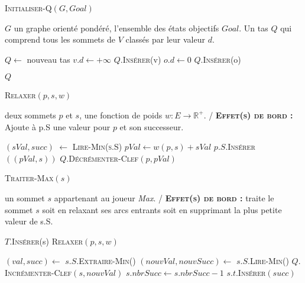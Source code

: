 

\begin{algorithm}
	\caption{\textsc {Initialiser-Q}$(G,Goal)$}
	 \label{algo:initQ}
	\begin{algorithmic}[1]
		\REQUIRE $G$ un graphe orienté pondéré, l'ensemble des états objectifs $Goal$.
		\ENSURE Un tas $Q$ qui comprend tous les sommets de $V$ classés par leur valeur $d$.
		
		\STATE $Q \leftarrow$ nouveau tas 
			\STATE $v.d \leftarrow +\infty$
			\STATE $Q.$\textsc{Insérer}(v)
		\ENDFOR
			\STATE $o.d \leftarrow 0$
			\STATE $Q.$\textsc{Insérer}(o)	
		\ENDFOR
		
		\RETURN $Q$
	
			
\end{algorithmic}
		
\end{algorithm}


\begin{algorithm}
	\caption{\textsc {Relaxer}$(p,s,w)$}
	 \label{algo:relaxerMinMax}
	\begin{algorithmic}[1]
		\REQUIRE deux sommets $p$ et $s$, une fonction de poids $w : E \rightarrow \mathbb{R}^{+}$.
		\ENSURE / \textbf{\textsc{Effet(s) de bord :}} Ajoute à p.S une valeur pour $p$ et son successeur.
		
		\STATE $(sVal,succ)$ $\leftarrow$ \textsc{Lire-Min(s.S)}
		\STATE $pVal \leftarrow w(p,s) + sVal$
		\STATE $p.S.$\textsc{Insérer}$((pVal,s))$
		\STATE $Q.$\textsc{Décrémenter-Clef}$(p,pVal)$
			
\end{algorithmic}
		
\end{algorithm}


\begin{algorithm}
	\caption{\textsc {Traiter-Max}$(s)$}
	 \label{algo:traiterMax}
	\begin{algorithmic}[1]
		\REQUIRE un sommet $s$ appartenant au joueur \textit{Max}.
		\ENSURE / \textbf{\textsc{Effet(s) de bord :}} traite le sommet $s$ soit en relaxant ses arcs entrants soit en supprimant la plus petite valeur de s.S.
		
			\STATE $T.$\textsc{Insérer}(s)
				\STATE \textsc{Relaxer}$(p,s,w)$ \label{lalgo:dijk3}
			\ENDFOR
			
		\ELSE
			\STATE $(val,succ) \leftarrow$ $s.S.$\textsc{Extraire-Min}()
			\STATE $(nouvVal,nouvSucc) \leftarrow$ $s.S.$\textsc{Lire-Min}()
			\STATE $Q.$\textsc{Incrémenter-Clef}$(s,nouvVal)$
			\STATE $s.nbrSucc \leftarrow s.nbrSucc - 1 $
			\STATE $s.t.$\textsc{Insérer}$(succ)$
		\ENDIF
			
				
			
\end{algorithmic}
		
\end{algorithm}

